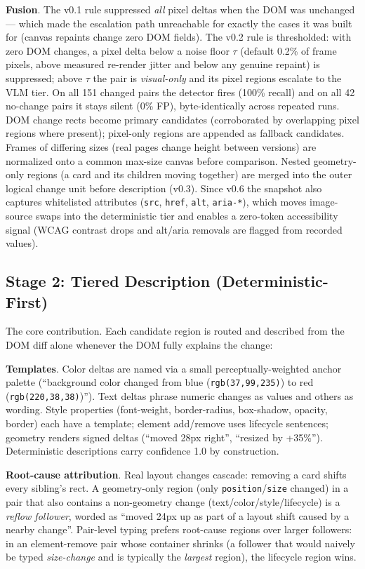 \documentclass[10pt,twocolumn,letterpaper]{article}
\begin{document}
\textbf{Fusion}. The v0.1 rule suppressed \emph{all} pixel deltas when the DOM was unchanged — which made the escalation path unreachable for exactly the cases it was built for (canvas repaints change zero DOM fields). The v0.2 rule is thresholded: with zero DOM changes, a pixel delta below a noise floor $\tau$ (default 0.2\% of frame pixels, above measured re-render jitter and below any genuine repaint) is suppressed; above $\tau$ the pair is \textit{visual-only} and its pixel regions escalate to the VLM tier. On all 151 changed pairs the detector fires (100\% recall) and on all 42 no-change pairs it stays silent (0\% FP), byte-identically across repeated runs. DOM change rects become primary candidates (corroborated by overlapping pixel regions where present); pixel-only regions are appended as fallback candidates. Frames of differing sizes (real pages change height between versions) are normalized onto a common max-size canvas before comparison. Nested geometry-only regions (a card and its children moving together) are merged into the outer logical change unit before description (v0.3). Since v0.6 the snapshot also captures whitelisted attributes (\texttt{src}, \texttt{href}, \texttt{alt}, \texttt{aria-*}), which moves image-source swaps into the deterministic tier and enables a zero-token accessibility signal (WCAG contrast drops and alt/aria removals are flagged from recorded values).

\subsection{Stage 2: Tiered Description (Deterministic-First)}

The core contribution. Each candidate region is routed and described from the DOM diff alone whenever the DOM fully explains the change:

\textbf{Templates}. Color deltas are named via a small perceptually-weighted anchor palette (``background color changed from blue (\texttt{rgb(37,99,235)}) to red (\texttt{rgb(220,38,38)})''). Text deltas phrase numeric changes as values and others as wording. Style properties (font-weight, border-radius, box-shadow, opacity, border) each have a template; element add/remove uses lifecycle sentences; geometry renders signed deltas (``moved 28px right'', ``resized by +35\%''). Deterministic descriptions carry confidence 1.0 by construction.

\textbf{Root-cause attribution}. Real layout changes cascade: removing a card shifts every sibling's rect. A geometry-only region (only \texttt{position}/\texttt{size} changed) in a pair that also contains a non-geometry change (text/color/style/lifecycle) is a \textit{reflow follower}, worded as ``moved 24px up as part of a layout shift caused by a nearby change''. Pair-level typing prefers root-cause regions over larger followers: in an element-remove pair whose container shrinks (a follower that would naively be typed \textit{size-change} and is typically the \textit{largest} region), the lifecycle region wins.
\end{document}
